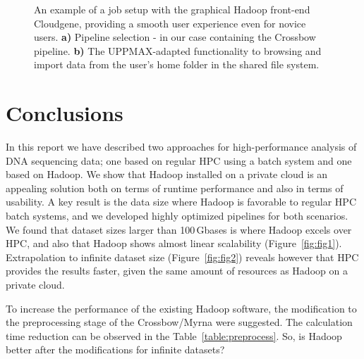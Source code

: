 \documentclass[11pt, oneside]{article}   	%
\newcommand{\COMMENT}[1]{{\color{red} #1 }}
\begin{document}
\begin{figure}
\begin{subfigure}[b]{0.6\textwidth}
		\subcaption{}
	\end{subfigure}
	\caption{An example of a job setup with the graphical Hadoop front-end Cloudgene, providing a smooth user experience even for novice users. \textbf{a)} Pipeline selection - in our case containing the Crossbow pipeline. \textbf{b)} The UPPMAX-adapted functionality to browsing and import data from the user's home folder in the shared file system.}
	\label{fig:fig4}
\end{figure}

\section{Conclusions}
\label{sectionV}

In this report we have described two approaches for high-performance analysis of DNA sequencing data; one based on regular HPC using a batch system and one based on Hadoop. We show that Hadoop installed on a private cloud is an appealing solution both on terms of runtime performance and also in terms of usability. A key result is the data size where Hadoop is favorable to regular HPC batch systems, and we developed highly optimized pipelines for both scenarios. We found that dataset sizes larger than 100\,Gbases is where Hadoop excels over HPC, and also that Hadoop shows almost linear scalability (Figure~\ref{fig:fig1}). Extrapolation to infinite dataset size (Figure~\ref{fig:fig2}) reveals however that HPC provides the results faster, given the same amount of resources as Hadoop on a private cloud.

To increase the performance of the existing Hadoop software, the modification to the preprocessing stage of the Crossbow/Myrna  were suggested.  The calculation time reduction can be observed in the Table~\ref{table:preprocess}. \COMMENT{So, is Hadoop better after the modifications for infinite datasets?}

\end{document}
